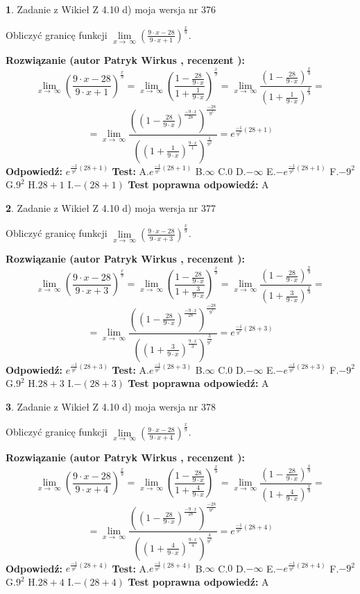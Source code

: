 \documentclass[12pt, a4paper]{article}
\theoremstyle{definition} %
\newtheorem{zad}{}
\newcommand{\zadStart}[1]{\begin{zad}#1\newline}
\newcommand{\zadStop}{\end{zad}}
\newcommand{\rozwStart}[2]{\noindent \textbf{Rozwiązanie (autor #1 , recenzent #2): }\newline}
\newcommand{\rozwStop}{\newline}
\newcommand{\odpStart}{\noindent \textbf{Odpowiedź:}\newline}
\newcommand{\odpStop}{\newline}
\newcommand{\testStart}{\noindent \textbf{Test:}\newline}
\newcommand{\testStop}{\newline}
\newcommand{\kluczStart}{\noindent \textbf{Test poprawna odpowiedź:}\newline}
\newcommand{\kluczStop}{\newline}
\begin{document}
\zadStart{Zadanie z Wikieł Z 4.10 d) moja wersja nr 376}


Obliczyć granicę funkcji  $\lim\limits_{x\to\ \infty}(\frac{9\cdot x-28}{9\cdot x+1})^{\frac{x}{9}}$.
\zadStop
\rozwStart{Patryk Wirkus}{}
$$\lim\limits_{x\to\ \infty}(\frac{9\cdot x-28}{9\cdot x+1})^{\frac{x}{9}} = \lim\limits_{x\to\ \infty}(\frac{1-\frac{28}{9\cdot x}}{1+\frac{1}{9\cdot x}})^{\frac{x}{9}}=\lim\limits_{x\to\ \infty}\frac{(1-\frac{28}{9\cdot x})^{\frac{x}{9}}}{(1+\frac{1}{9\cdot x})^{\frac{x}{9}}}=$$
$$=\lim\limits_{x\to\ \infty}\frac{((1-\frac{28}{9\cdot x})^{\frac{-9\cdot x}{28}})^{\frac{-28}{9^{2}}}}{((1+\frac{1}{9\cdot x})^{\frac{9\cdot x}{1}})^{\frac{1}{9^{2}}}}=e^{\frac{-1}{9^{2}}(28+1)}$$
\rozwStop
\odpStart
$e^{\frac{-1}{9^{2}}(28+1)}$
\odpStop
\testStart
A.$e^{\frac{-1}{9^{2}}(28+1)}$ B.$\infty$ C.$0$ D.$-\infty$ E.$-e^{\frac{-1}{9^{2}}(28+1)}$
F.$-9^{2}$ G.$9^{2}$
H.$28+1$
I.$-(28+1)$
\testStop
\kluczStart
A
\kluczStop



\zadStart{Zadanie z Wikieł Z 4.10 d) moja wersja nr 377}


Obliczyć granicę funkcji  $\lim\limits_{x\to\ \infty}(\frac{9\cdot x-28}{9\cdot x+3})^{\frac{x}{9}}$.
\zadStop
\rozwStart{Patryk Wirkus}{}
$$\lim\limits_{x\to\ \infty}(\frac{9\cdot x-28}{9\cdot x+3})^{\frac{x}{9}} = \lim\limits_{x\to\ \infty}(\frac{1-\frac{28}{9\cdot x}}{1+\frac{3}{9\cdot x}})^{\frac{x}{9}}=\lim\limits_{x\to\ \infty}\frac{(1-\frac{28}{9\cdot x})^{\frac{x}{9}}}{(1+\frac{3}{9\cdot x})^{\frac{x}{9}}}=$$
$$=\lim\limits_{x\to\ \infty}\frac{((1-\frac{28}{9\cdot x})^{\frac{-9\cdot x}{28}})^{\frac{-28}{9^{2}}}}{((1+\frac{3}{9\cdot x})^{\frac{9\cdot x}{3}})^{\frac{3}{9^{2}}}}=e^{\frac{-1}{9^{2}}(28+3)}$$
\rozwStop
\odpStart
$e^{\frac{-1}{9^{2}}(28+3)}$
\odpStop
\testStart
A.$e^{\frac{-1}{9^{2}}(28+3)}$ B.$\infty$ C.$0$ D.$-\infty$ E.$-e^{\frac{-1}{9^{2}}(28+3)}$
F.$-9^{2}$ G.$9^{2}$
H.$28+3$
I.$-(28+3)$
\testStop
\kluczStart
A
\kluczStop



\zadStart{Zadanie z Wikieł Z 4.10 d) moja wersja nr 378}


Obliczyć granicę funkcji  $\lim\limits_{x\to\ \infty}(\frac{9\cdot x-28}{9\cdot x+4})^{\frac{x}{9}}$.
\zadStop
\rozwStart{Patryk Wirkus}{}
$$\lim\limits_{x\to\ \infty}(\frac{9\cdot x-28}{9\cdot x+4})^{\frac{x}{9}} = \lim\limits_{x\to\ \infty}(\frac{1-\frac{28}{9\cdot x}}{1+\frac{4}{9\cdot x}})^{\frac{x}{9}}=\lim\limits_{x\to\ \infty}\frac{(1-\frac{28}{9\cdot x})^{\frac{x}{9}}}{(1+\frac{4}{9\cdot x})^{\frac{x}{9}}}=$$
$$=\lim\limits_{x\to\ \infty}\frac{((1-\frac{28}{9\cdot x})^{\frac{-9\cdot x}{28}})^{\frac{-28}{9^{2}}}}{((1+\frac{4}{9\cdot x})^{\frac{9\cdot x}{4}})^{\frac{4}{9^{2}}}}=e^{\frac{-1}{9^{2}}(28+4)}$$
\rozwStop
\odpStart
$e^{\frac{-1}{9^{2}}(28+4)}$
\odpStop
\testStart
A.$e^{\frac{-1}{9^{2}}(28+4)}$ B.$\infty$ C.$0$ D.$-\infty$ E.$-e^{\frac{-1}{9^{2}}(28+4)}$
F.$-9^{2}$ G.$9^{2}$
H.$28+4$
I.$-(28+4)$
\testStop
\kluczStart
A
\kluczStop
\end{document}
